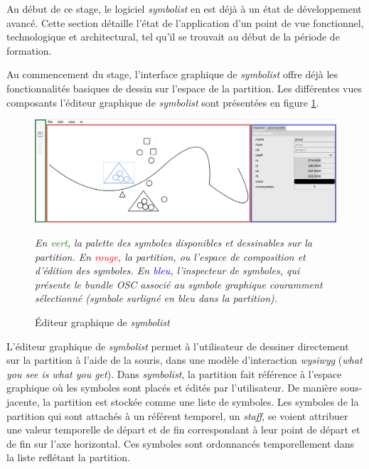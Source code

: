 Au début de ce stage, le logiciel \textit{symbolist} en est déjà à un état de développement avancé. Cette section détaille l'état de l'application d'un point de vue fonctionnel, technologique et architectural, tel qu'il se trouvait au début de la période de formation.

Au commencement du stage, l'interface graphique de \textit{symbolist} offre déjà les fonctionnalités basiques de dessin sur l'espace de la partition. Les différentes vues composants l'éditeur graphique de \textit{symbolist} sont présentées en figure \ref{fig:symbolistUIBefore}.

\begin{figure}[H]
	\centering
	\includegraphics[keepaspectratio=true, width=\textwidth]{LeProjetSymbolist/i/symbolistUIBefore.png}
	\caption{Éditeur graphique de \textit{symbolist}}
	\label{fig:symbolistUIBefore}
	\small
	\it
	En \textcolor{green}{vert}, la palette des symboles disponibles et dessinables sur la partition. En \textcolor{red}{rouge}, la partition, ou l'espace de composition et d'édition des symboles. En \textcolor{blue}{bleu}, l'inspecteur de symboles, qui présente le bundle OSC associé au symbole graphique couramment sélectionné (symbole surligné en bleu dans la partition).
\end{figure}

L'éditeur graphique de \textit{symbolist} permet à l'utilisateur de dessiner directement sur la partition à l'aide de la souris, dans une modèle d'interaction \textit{wysiwyg} (\textit{what you see is what you get}). Dans \textit{symbolist}, la partition fait référence à l'espace graphique où les symboles sont placés et édités par l'utilisateur. De manière sous-jacente, la partition est stockée comme une liste de symboles. Les symboles de la partition qui sont attachés à un référent temporel, un \textit{staff}, se voient attribuer une valeur temporelle de départ et de fin correspondant à leur point de départ et de fin sur l'axe horizontal. Ces symboles sont ordonnancés temporellement dans la liste reflétant la partition.

